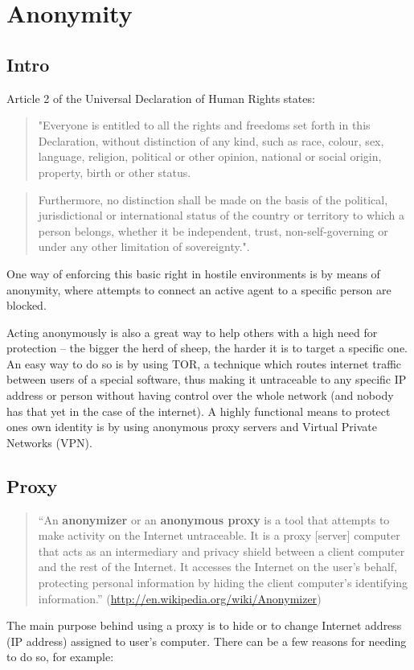 \section{Anonymity}

\subsection{Intro}

Article 2 of the Universal Declaration of Human Rights states:

\begin{quote}
"Everyone is entitled to all the rights and freedoms set forth in this
Declaration, without distinction of any kind, such as race, colour, sex,
language, religion, political or other opinion, national or social
origin, property, birth or other status.

\end{quote}
\begin{quote}
Furthermore, no distinction shall be made on the basis of the political,
jurisdictional or international status of the country or territory to
which a person belongs, whether it be independent, trust,
non-self-governing or under any other limitation of sovereignty.".

\end{quote}
One way of enforcing this basic right in hostile environments is by
means of anonymity, where attempts to connect an active agent to a
specific person are blocked.

Acting anonymously is also a great way to help others with a high need
for protection -- the bigger the herd of sheep, the harder it is to
target a specific one. An easy way to do so is by using TOR, a technique
which routes internet traffic between users of a special software, thus
making it untraceable to any specific IP address or person without
having control over the whole network (and nobody has that yet in the
case of the internet). A highly functional means to protect ones own
identity is by using anonymous proxy servers and Virtual Private
Networks (VPN).

\subsection{Proxy}

\begin{quote}
``An \textbf{anonymizer} or an \textbf{anonymous proxy} is a tool that
attempts to make activity on the Internet untraceable. It is a proxy
{[}server{]} computer that acts as an intermediary and privacy shield
between a client computer and the rest of the Internet. It accesses the
Internet on the user's behalf, protecting personal information by hiding
the client computer's identifying information.''
(\href{http://en.wikipedia.org/wiki/Anonymizer}{http://en.wikipedia.org/wiki/Anonymizer})

\end{quote}
The main purpose behind using a proxy is to hide or to change Internet
address (IP address) assigned to user's computer. There can be a few
reasons for needing to do so, for example:

